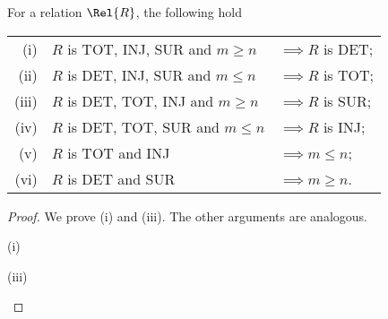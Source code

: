 \documentclass[manyauthors]{fundam}
\begin{document}
\begin{theorem}
  \label{thm:poset_of_fundamental_properties}
  For a relation $\Rel{R}$, the following hold\newline
\begin{tabular}{rll}
(i)   & $R$ is TOT, INJ, SUR and $m \geq n$ & $\implies R$ is DET; \\
(ii)  & $R$ is DET, INJ, SUR and $m \leq n$ & $\implies R$ is TOT; \\
(iii) & $R$ is DET, TOT, INJ and $m \geq n$ & $\implies R$ is SUR; \\
(iv)  & $R$ is DET, TOT, SUR and $m \leq n$ & $\implies R$ is INJ; \\
(v)   & $R$ is TOT and INJ                  & $\implies m \leq n$; \\
(vi)  & $R$ is DET and SUR                  & $\implies m \geq n$.
\end{tabular}
\end{theorem}
\begin{proof} We prove (i) and (iii). The other arguments are analogous.

(i)
\begin{hcalculation}[=]{}
\end{hcalculation}

(iii)
\begin{hcalculation}[=]{}
\end{hcalculation}
\end{proof}
\end{document}
